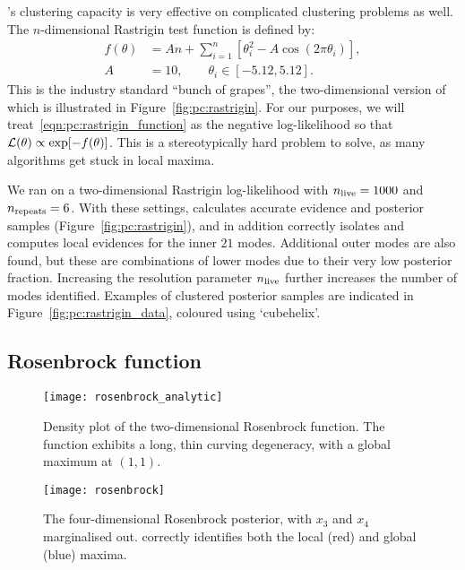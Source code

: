 \PolyChord{}'s clustering capacity is very effective on complicated clustering problems as well. The $n$-dimensional Rastrigin test function is defined by:
\begin{align}
  f(\theta) &= A n + \sum\limits_{i=1}^n \left[\theta_i^2 - A\cos(2 \pi \theta_i) \right],
  \label{eqn:pc:rastrigin_function}
  \\
  A&=10, \qquad \theta_i \in [-5.12,5.12]. \nonumber
\end{align}
This is the industry standard ``bunch of grapes'', the two-dimensional version of which is illustrated in Figure~\ref{fig:pc:rastrigin}.
For our purposes, we will treat~\eqref{eqn:pc:rastrigin_function} as the negative log-likelihood so that $\mathcal{L}(\theta) \propto \exp[-f(\theta)]$.
This is a stereotypically hard problem to solve, as many algorithms get stuck in local maxima.



We ran \PolyChord{} on a two-dimensional Rastrigin log-likelihood  with $n_{\mathrm{live}}=1000$ and $n_{\mathrm{repeats}}=6$. With these settings, \PolyChord{} calculates accurate evidence and posterior samples (Figure~\ref{fig:pc:rastrigin}), and in addition correctly isolates and computes local evidences for the inner $21$ modes. Additional outer modes are also found, but these are combinations of lower modes due to their very low posterior fraction. Increasing the resolution parameter $n_{\mathrm{live}}$ further increases the number of modes identified.  Examples of clustered posterior samples are indicated in Figure~\ref{fig:pc:rastrigin_data}, coloured using  `cubehelix'.


\subsection{Rosenbrock function}
\label{sec:pc:rosenbrock}

\begin{figure}
  \centering
  \texttt{[image: rosenbrock\_analytic]}
  \caption{Density plot of the two-dimensional Rosenbrock function. The function exhibits a long, thin curving degeneracy, with a global maximum at $(1,1)$. \label{fig:pc:rosenbrock_2d}}
\end{figure}

\begin{figure}
  \centering
  \texttt{[image: rosenbrock]}
  \caption{The four-dimensional Rosenbrock posterior, with $x_3$ and $x_4$ marginalised out. \PolyChord{} correctly identifies both the local (red) and global (blue) maxima.\label{fig:pc:rosenbrock}}
\end{figure}


